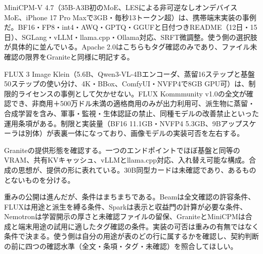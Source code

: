 \documentclass[lualatex,a4paper,10pt]{jlreq}
\begin{document}
\surveycover
\clearpage
\twocolumn
MiniCPM-V 4.7（35B-A3B初のMoE、LESによる非可逆なしオンデバイスMoE、iPhone 17 Pro Maxで3GB・毎秒13トークン超）は、携帯端末実装の事例だ。BF16・FP8・int4・AWQ・GPTQ・GGUFと日付つきREADME（12日・15日）、SGLang・vLLM・llama.cpp・Ollama対応、SRFT微調整。使う側の選択肢が具体的に並んでいる。Apache 2.0はこちらもタグ確認のみであり、ファイル未確認の限界をGraniteと同様に明記する。
\cite{B27,B74,B26}

FLUX 3 Image Klein（5.6B、Qwen3-VL-4Bエンコーダ、蒸留16ステップと基盤50ステップの使い分け、4K・BBox、ComfyUI・NVFP4で8GB GPU可）は、制限的ライセンスの事例として欠かせない。FLUX Kommmunity v1.0の全文が確認でき、非商用＋500万ドル未満の適格商用のみが出力利用可、派生物に蒸留・合成学習を含み、軍事・監視・生体認証の禁止、同種モデルの改善禁止といった運用条項がある。制限と実装量（BF16 11.1GB・NVFP4 5.3GB、9Bアップスケーラは別体）が表裏一体になっており、画像モデルの実装可否を左右する。
\cite{B29,B28,B30}

Graniteの提供形態を確認する。一つのエンドポイントでほぼ基盤と同等のVRAM、共有KVキャッシュ、vLLMとllama.cpp対応、入れ替え可能な構成。合成の思想が、提供の形に表れている。30B同型カードは未確認であり、あるものとないものを分ける。
\cite{B24,B73,B23,B25}

重みの公開は進んだが、条件はまちまちである。Beamは全文確認の許容条件、FLUXは用途と派生を縛る条件、Sparkは表示と収益門の計算が必要な条件、Nemotronは学習開示の厚さと未確認ファイルの留保、GraniteとMiniCPMは合成と端末用途の試用に適したタグ確認の条件。実装の可否は重みの有無ではなく条件で決まる。使う側は自分の用途が表のどの行に属するかを確認し、契約判断の前に四つの確認水準（全文・条項・タグ・未確認）を照合してほしい。
\cite{B14,B70,B15,B13,B71,B17,B19,B18,B16,B21,B72,B22,B20,B24,B73,B23,B25,B27,B74,B26,B29,B28,B30}
\end{document}
